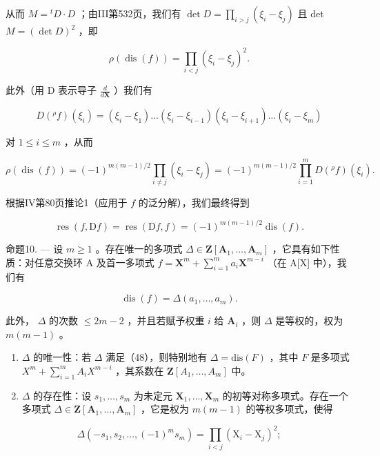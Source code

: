 从而 \(M = {}^t D \cdot D\) ；由III第532页，我们有 \(\det D = \prod_{i > j} (\xi_i - \xi_j)\) 且 det \(M = (\det D)^2\) ，即

\[
\rho (\operatorname{dis} (f)) = \prod_ {i <   j} \left(\xi_ {i} - \xi_ {j}\right) ^ {2}.\tag{46}
\]

此外（用 D 表示导子 \(\frac{d}{d\mathbf{X}}\) ）我们有

\[
D (^ {\rho} f) (\xi_ {i}) = (\xi_ {i} - \xi_ {1}) \dots (\xi_ {i} - \xi_ {i - 1}) (\xi_ {i} - \xi_ {i + 1}) \dots (\xi_ {i} - \xi_ {m})
\]

对 \(1 \leqslant i \leqslant m\) ，从而

\[
\rho (\operatorname{dis} (f)) = (- 1) ^ {m (m - 1) / 2} \prod_ {i \neq j} (\xi_ {i} - \xi_ {j}) = (- 1) ^ {m (m - 1) / 2} \prod_ {i = 1} ^ {m} D (^ {\rho} f) (\xi_ {i}).
\]

根据IV第80页推论1（应用于 \(f\) 的泛分解），我们最终得到

\[
\operatorname{res} (f, \mathrm{D} f) = \operatorname{res} (\mathrm{D} f, f) = (- 1) ^ {m (m - 1) / 2} \operatorname{dis} (f).\tag{47}
\]

命题10. --- 设 \(m \geqslant 1\) 。存在唯一的多项式 \(\Delta \in \mathbf{Z}[\mathbf{A}_1, \ldots, \mathbf{A}_m]\) ，它具有如下性质：对任意交换环 A 及首一多项式 \(f = \mathbf{X}^m + \sum_{i=1}^{m} a_i \mathbf{X}^{m-i}\) （在 A{[}X{]} 中），我们有

\[
\operatorname{dis} (f) = \Delta \left(a _ {1}, \dots , a _ {m}\right).\tag{48}
\]

此外， \(\Delta\) 的次数 \(\leqslant 2m - 2\) ，并且若赋予权重 \(i\) 给 \(\mathbf{A}_i\) ，则 \(\Delta\) 是等权的，权为 \(m(m - 1)\) 。

\begin{enumerate}
\def\labelenumi{\alph{enumi})}
\item
  \(\Delta\) 的唯一性：若 \(\Delta\) 满足（48），则特别地有 \(\Delta = \text{dis}(F)\) ，其中 \(F\) 是多项式 \(X^{m} + \sum_{i=1}^{m} A_{i} X^{m-i}\) ，其系数在 \(\mathbf{Z}[A_{1}, \ldots, A_{m}]\) 中。
\item
  \(\Delta\) 的存在性：设 \(s_1, \ldots, s_m\) 为未定元 \(\mathbf{X}_1, \ldots, \mathbf{X}_m\) 的初等对称多项式。存在一个多项式 \(\Delta \in \mathbf{Z}[\mathbf{A}_1, \ldots, \mathbf{A}_m]\) ，它是权为 \(m(m-1)\) 的等权多项式，使得
\end{enumerate}

\[
\Delta \left(- s _ {1}, s _ {2}, \dots , (- 1) ^ {m} s _ {m}\right) = \prod_ {i <   j} \left(\mathrm{X} _ {i} - \mathrm{X} _ {j}\right) ^ {2};\tag{49}
\]

